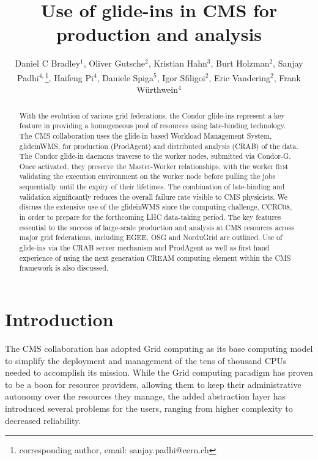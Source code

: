 \documentclass[a4paper]{jpconf}
\begin{document}
\title{Use of glide-ins in CMS for production and analysis}

\author{Daniel C Bradley$^1$, Oliver Gutsche$^2$, Kristian Hahn$^3$, Burt Holzman$^2$, Sanjay Padhi$^{4,}$\footnote[6]{corresponding author, email: sanjay.padhi@cern.ch}, Haifeng Pi$^4$, Daniele Spiga$^5$, Igor Sfiligoi$^2$, Eric Vandering$^2$, Frank W\"urthwein$^4$}

\address{$^1$ University of Wisconsin-Madison, 1150 University Avenue, Madison, WI 53706-1390, USA}
\address{$^2$ Fermilab, P.O. Box 500, Batavia, IL 60510-5011, USA}
\address{$^3$ Department of Physics, MIT, 77 Massachusetts Avenue, Cambridge, MA 02139-4307, USA}
\address{$^4$ University of California, San Diego, 9500 Gilman Drive, La Jolla, CA 92093-0354, USA}
\address{$^5$ CERN, CH - 1211 Geneva 23, Switzerland}

\begin{abstract}
With the evolution of various grid federations, the Condor glide-ins represent a key feature in providing a homogeneous pool of resources using late-binding technology. The CMS collaboration uses the glide-in based Workload Management System, glideinWMS, for production (ProdAgent) and distributed analysis (CRAB) of the data. The Condor glide-in daemons traverse to the worker nodes, submitted via Condor-G. Once activated, they preserve the Master-Worker relationships, with the worker first validating the execution environment on the worker node before pulling the jobs sequentially until the expiry of their lifetimes. The combination of late-binding and validation significantly reduces the overall failure rate visible to CMS physicists. We discuss the extensive use of the glideinWMS since the computing challenge, CCRC08, in order to prepare for the forthcoming LHC data-taking period. The key features essential to the success of large-scale production and analysis at CMS resources across major grid federations, including EGEE, OSG and NorduGrid are outlined. Use of glide-ins via the CRAB server mechanism and ProdAgent as well as first hand experience of using the next generation CREAM computing element within the CMS framework is also discussed.
\end{abstract}

\section{Introduction}

The CMS collaboration has adopted Grid computing as its base computing model to simplify the deployment and management of the
tens of thousand CPUs needed to accomplish its mission.
While the Grid computing paradigm has proven to be a boon for resource providers, 
allowing them to keep their administrative autonomy over the resources they manage,
the added abstraction layer has introduced several problems for the users, 
ranging from higher complexity to decreased reliability.
\end{document}
